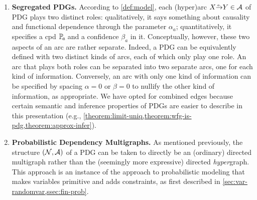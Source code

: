 \begin{enumerate}[wide, label={\textbf{PDG Variant \arabic{*}:}}]
	\item
	\textbf{Segregated PDGs.}
	According to \cref{def:model}, each
	(hyper)arc $\ed aXY \in \Ar$ of PDG plays two distinct roles: 
	qualitatively, it says something about causality and functional dependence through the parameter $\alpha_a$;
	quantitatively, it specifies a cpd $\p_a$ and a confidence $\beta_a$ in it. 
	Conceptually, however, these two aspects of an arc are rather separate. 
	Indeed, a PDG can be equivalently defined with two distinct kinds of arcs, each of which only play one role. An arc that plays both roles can be separated into two separate arcs, one for each kind of information. Conversely, an arc with only one kind of information can be specified by spacing $\alpha = 0$ or $\beta = 0$ to nullify the other kind of information, as appropriate. 
	We have opted for combined edges because certain semantic and inference properties of PDGs are easier to describe in this presentation (e.g., \cref{theorem:limit-uniq,theorem:wfg-is-pdg,theorem:approx-infer}). 


    \item 
	\textbf{Probabilistic Dependency Multigraphs. }
	As mentioned previously,
    the structure $(\mathcal N, \mathcal A)$ of a PDG can be taken to directly be an (ordinary) directed multigraph rather than the (seemingly more expressive) directed \emph{hyper}graph. 
	This approach is an instance of the
    approach to probabilistic modeling that makes variables primitive and adds constraints,
    as first described in \cref{sec:var-randomvar,ssec:fin-prob}.


\end{enumerate}
